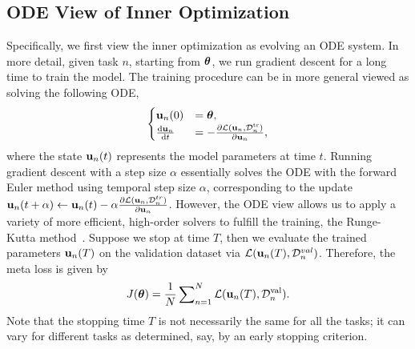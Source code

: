 \subsection{ODE View of Inner Optimization}
Specifically, we first view the inner optimization as evolving an ODE system. In more detail, given task $n$,  starting from $\boldsymbol{\theta}$, we run gradient descent for a long time to train the model. The training procedure can be in more general viewed as solving the following ODE,
\begin{equation}
	\begin{cases}
	{\bf u}_n(0) &= \boldsymbol{\theta}, \notag \\
	\frac{{\rm d} {\bf u}_n}{{\rm d} t} &= -\frac{\partial \mathcal{L}({\bf u}_n, \mathcal{D}_n^{\text{tr}})}{\partial {\bf u}_n},
	\end{cases} 
\end{equation}
where the state ${\bf u}_n(t)$ represents the model parameters at time $t$. Running gradient descent with a step size 
$\alpha$ essentially solves the ODE with the forward Euler method using temporal step size $\alpha$, 
corresponding to the update ${\bf u}_n(t+\alpha) \leftarrow {\bf u}_n(t) - \alpha \frac{\partial \mathcal{L}({\bf u}_n, \mathcal{D}_n^{tr})}{\partial {\bf u}_n}$. However, the ODE view allows us to apply a variety of more efficient, high-order solvers to fulfill the training, \eg the Runge-Kutta method~\citep{dormand1980family}. Suppose we stop at time $T$, then we evaluate the trained parameters ${\bf u}_n(T)$ on the validation dataset via $\mathcal{L}({\bf u}_n(T), \mathcal{D}_n^{val})$. Therefore, the meta loss is given by
\begin{align}
	J(\boldsymbol{\theta}) = \frac{1}{N}\sum\nolimits_{n=1}^N \mathcal{L}({\bf u}_n(T), \mathcal{D}_n^{\text{val}}). \label{eq:meta-loss-ode}
\end{align}
Note that the stopping time $T$ is not necessarily the same for all the tasks; it can vary for different tasks as determined, say, by an early stopping criterion. 

